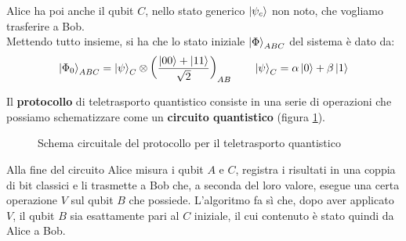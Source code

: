 \documentclass[../../InformazioneQuantistica.tex]{subfiles}
\begin{document}
Alice ha poi anche il qubit $C$, nello stato generico $\Ket{\psi_c}$ non noto, che vogliamo trasferire a Bob.\\

Mettendo tutto insieme, si ha che lo stato iniziale $\Ket{\Phi}_{ABC}$ del sistema è dato da:
\begin{align*}
\Ket{\Phi_0}_{ABC} = \Ket{\psi}_C \otimes \left(\frac{\Ket{00}+\Ket{11}}{\sqrt{2}}\right)_{AB} \qquad \Ket{\psi}_C = \alpha \Ket{0}+\beta \Ket{1}
\end{align*}

Il \textbf{protocollo} di teletrasporto quantistico consiste in una serie di operazioni che possiamo schematizzare come un \textbf{circuito quantistico} (figura \ref{fig:teletrasporto-circuito}).


\begin{figure}[H]
\centering

\caption{Schema circuitale del protocollo per il teletrasporto quantistico
\label{fig:teletrasporto-circuito}}
\end{figure}

Alla fine del circuito Alice misura i qubit $A$ e $C$, registra i risultati in una coppia di bit classici e li trasmette a Bob che, a seconda del loro valore, esegue una certa operazione $V$ sul qubit $B$ che possiede. L'algoritmo fa sì che, dopo aver applicato $V$, il qubit $B$ sia esattamente pari al $C$ iniziale, il cui contenuto è stato quindi  da Alice a Bob.\\
\end{document}

